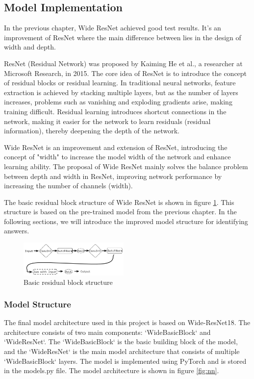 \documentclass[twocolumn]{article}
\begin{document}
    \subsection{Model Implementation}
    In the previous chapter, Wide ResNet achieved good test results. It's an improvement of ResNet where the main difference between lies in the design of width and depth. 

    ResNet (Residual Network) was proposed by Kaiming He et al.\cite{resnet}, a researcher at Microsoft Research, in 2015. The core idea of ResNet is to introduce the concept of residual blocks or residual learning. In traditional neural networks, feature extraction is achieved by stacking multiple layers, but as the number of layers increases, problems such as vanishing and exploding gradients arise, making training difficult. Residual learning introduces shortcut connections in the network, making it easier for the network to learn residuals (residual information), thereby deepening the depth of the network\cite{wightman2021resnet}.

    Wide ResNet is an improvement and extension of ResNet, introducing the concept of "width" to increase the model width of the network and enhance learning ability\cite{zagoruyko2017wide}. The proposal of Wide ResNet mainly solves the balance problem between depth and width in ResNet, improving network performance by increasing the number of channels (width).

    The basic residual block structure of Wide ResNet is shown in figure \ref{fig:common_res_block}. This structure is based on the pre-trained model from the previous chapter. In the following sections, we will introduce the improved model structure for identifying answers.

        \begin{figure}[ht]
            \centering
            \includegraphics[width=0.48\textwidth]{common_res_block.png}
            \caption{Basic residual block structure}
            \label{fig:common_res_block}
        \end{figure}
    

    \subsubsection{Model Structure}
    The final model architecture used in this project is based on Wide-ResNet18. The architecture consists of two main components: `WideBasicBlock` and `WideResNet`. The `WideBasicBlock` is the basic building block of the model, and the `WideResNet` is the main model architecture that consists of multiple `WideBasicBlock` layers. The model is implemented using PyTorch and is stored in the models.py file. The model architecture is shown in figure \ref{fig:nn}.
\end{document}
